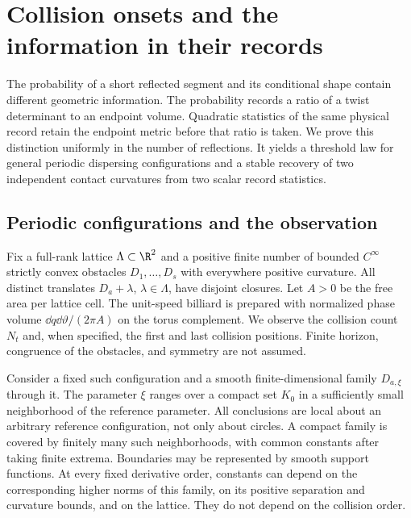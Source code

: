 \section{Collision onsets and the information in their records}
\label{sec:geometric-results}
The probability of a short reflected segment and its conditional shape
contain different geometric information. The probability records a
ratio of a twist determinant to an endpoint volume. Quadratic statistics
of the same physical record retain the endpoint metric before that ratio
is taken. We prove this distinction uniformly in the number of
reflections. It yields a threshold law for general periodic dispersing
configurations and a stable recovery of two independent contact
curvatures from two scalar record statistics.

\subsection{Periodic configurations and the observation}
Fix a full-rank lattice $\Lambda\subset\R^2$ and a positive finite number of bounded
$C^\infty$ strictly convex obstacles $D_1,\ldots,D_s$ with everywhere
positive curvature. All distinct translates $D_a+\lambda$, $\lambda\in
\Lambda$, have disjoint closures. Let $A>0$ be the free area per lattice
cell. The unit-speed billiard is prepared with normalized phase volume
$\dd q\dd\vartheta/(2\pi A)$ on the torus complement. We observe the
collision count $N_t$ and, when specified, the first and last collision
positions. Finite horizon, congruence of the obstacles, and symmetry
are not assumed.

Consider a fixed such configuration and a smooth finite-dimensional
family $D_{a,\xi}$ through it. The parameter $\xi$ ranges over a compact
set $K_0$ in a sufficiently small neighborhood of the reference parameter.
All conclusions are local about an arbitrary reference configuration,
not only about circles. A compact family is covered by finitely many
such neighborhoods, with common constants after taking finite extrema.
Boundaries may be represented by smooth support functions. At every
fixed derivative order, constants can depend on the corresponding
higher norms of this family, on its positive separation and curvature
bounds, and on the lattice. They do not depend on the collision order.

